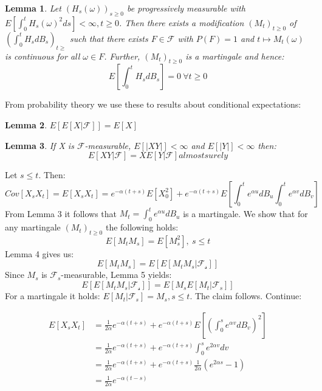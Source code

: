 \documentclass[%
thesis=student,%
coverpage=false,%
titlepage=false,%
headmarks=true, %
german,%
font=libertine, %
math=newpxtx, %
BCOR=5mm,%
coverBCOR=11mm%
]{tumbook}
\newtheorem{lemma}{Lemma}
\begin{document}
\begin{lemma}
    Let $(H_{s}(\omega))_{s\geq 0}$ be progressively measurable with $E[\int_{0}^{t} H_{s}(\omega)^{2}ds] < \infty, t \geq 0$. Then there exists a modification $(M_{t})_{t\geq 0}$ of $(\int_{0}^{t}H_{s}dB_{s})_{t\geq}$ such that there exists $F \in \mathcal{F}$ with $P(F) = 1$ and $t \mapsto M_{t}(\omega)$ is continuous for all $\omega \in F$. Further, $(M_{t})_{t\geq 0}$ is a martingale and hence:
    \[
    E[\int_{0}^{t}H_{s}dB_{s}] = 0 \ \forall t \geq 0
    \]
\end{lemma}

From probability theory we use these to results about conditional expectations:

\begin{lemma}
    $E[E[X|\mathcal{F}]] = E[X]$
\end{lemma}

\begin{lemma}
    If X is $\mathcal{F}$-measurable, $E[\lvert XY \rvert] < \infty$ and $E[\lvert Y \rvert]< \infty$ then:
    \[
    E[XY|\mathcal{F}] = XE[Y|\mathcal{F}]  almost surely
    \]
\end{lemma}

Let $s \leq t$. Then:
\[
Cov[X_{s}X_{t}]=E[X_{s}X_{t}] = e^{-\alpha(t+s)}E[X_{0}^{2}] + e^{-\alpha(t+s)}E[\int_{0}^{t}e^{\alpha u}dB_{u}\int_{0}^{t}e^{\alpha v}dB_{v}]
\]
From Lemma 3 it follows that $M_{t} = \int_{0}^{t}e^{\alpha u}dB_{u}$ is a martingale. We show that for any martingale $(M_{t})_{t \geq 0}$ the following holds: 
\[
E[M_{t}M_{s}] = E[M_{s}^{2}], \ s \leq t
\]
Lemma 4 gives us:
\[
E[M_{t}M_{s}] = E[E[M_{t}M_{s}|\mathcal{F_{s}}]]
\]
Since $M_{s}$ is $\mathcal{F}_{s}$-measurable, Lemma 5 yields:
\[
E[E[M_{t}M_{s}|\mathcal{F_{s}}]] = E[M_{s}E[M_{t}|\mathcal{F}_{s}]]
\]
For a martingale it holds: $E[M_{t}|\mathcal{F}_{s}] = M_{s}, s \leq t$. The claim follows. Continue:


\begin{subequations}
    \begin{align*}
        E[X_{s}X_{t}] &= \frac{1}{2\alpha}e^{-\alpha(t+s)} + e^{-\alpha(t+s)}E[(\int_{0}^{s}e^{\alpha v}dB_{v})^{2}]   \\
         &= \frac{1}{2\alpha}e^{-\alpha(t+s)} + e^{-\alpha(t+s)}\int_{0}^{s}e^{2\alpha v}dv \\
         &= \frac{1}{2\alpha}e^{-\alpha(t+s)} + e^{-\alpha(t+s)}\frac{1}{2\alpha}(e^{2\alpha s} - 1) \\
         &= \frac{1}{2\alpha}e^{-\alpha(t-s)} 
    \end{align*}
\end{subequations}   
\end{document}
